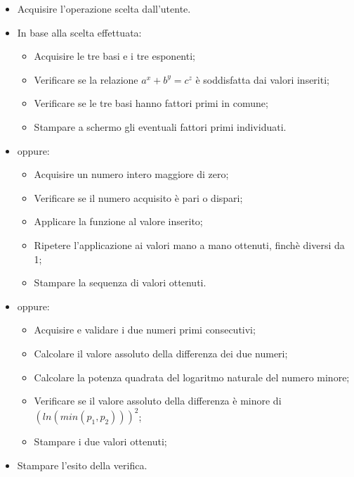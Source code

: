 \documentclass[10pt]{report}
\begin{document}
\begin{itemize}
\item Acquisire l'operazione scelta dall'utente.
\item In base alla scelta effettuata:
    \begin{itemize}
    \item Acquisire le tre basi e i tre esponenti;
    \item Verificare se la relazione $a^x + b^y = c^z$ è soddisfatta dai valori inseriti;
    \item Verificare se le tre basi hanno fattori primi in comune;
    \item Stampare a schermo gli eventuali fattori primi individuati.
    \end{itemize}

    \item oppure:

    \begin{itemize}
    \item Acquisire un numero intero maggiore di zero;
    \item Verificare se il numero acquisito è pari o dispari;
    \item Applicare la funzione al valore inserito;
    \item Ripetere l'applicazione ai valori mano a mano ottenuti, finchè diversi da 1;
    \item Stampare la sequenza di valori ottenuti.
    
    \end{itemize}

    \item oppure:
    \begin{itemize}
        \item Acquisire e validare i due numeri primi consecutivi;
        \item Calcolare il valore assoluto della differenza dei due numeri;
        \item Calcolare la potenza quadrata del logaritmo naturale del numero minore;
        \item Verificare se il valore assoluto della differenza è minore di $(ln(min(p_1, p_2)))^2$;
        \item Stampare i due valori ottenuti;
    \end{itemize}

    \item Stampare l'esito della verifica.
\end{itemize}
\end{document}
